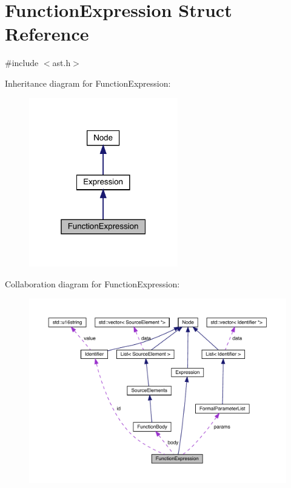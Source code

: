 \hypertarget{struct_function_expression}{}\section{Function\+Expression Struct Reference}
\label{struct_function_expression}


{\ttfamily \#include $<$ast.\+h$>$}



Inheritance diagram for Function\+Expression\+:
\nopagebreak
\begin{figure}[H]
\begin{center}
\leavevmode
\includegraphics[width=184pt]{struct_function_expression__inherit__graph}
\end{center}
\end{figure}


Collaboration diagram for Function\+Expression\+:
\nopagebreak
\begin{figure}[H]
\begin{center}
\leavevmode
\includegraphics[width=350pt]{struct_function_expression__coll__graph}
\end{center}
\end{figure}
